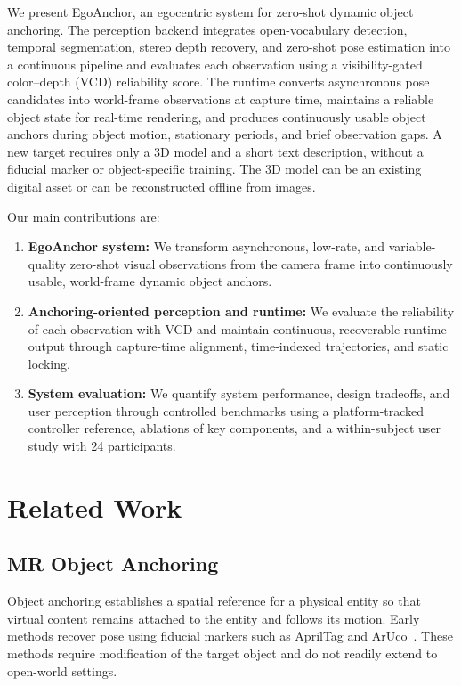 \documentclass[review]{vgtc}
\begin{document}
We present EgoAnchor, an egocentric system for zero-shot dynamic object anchoring. The perception backend integrates open-vocabulary detection, temporal segmentation, stereo depth recovery, and zero-shot pose estimation into a continuous pipeline and evaluates each observation using a visibility-gated color--depth (VCD) reliability score. The runtime converts asynchronous pose candidates into world-frame observations at capture time, maintains a reliable object state for real-time rendering, and produces continuously usable object anchors during object motion, stationary periods, and brief observation gaps. A new target requires only a 3D model and a short text description, without a fiducial marker or object-specific training. The 3D model can be an existing digital asset or can be reconstructed offline from images.

Our main contributions are:
\begin{enumerate}[leftmargin=1.8em,itemsep=1pt,topsep=2pt]
  \item \textbf{EgoAnchor system:} We transform asynchronous, low-rate, and variable-quality zero-shot visual observations from the camera frame into continuously usable, world-frame dynamic object anchors.
  \item \textbf{Anchoring-oriented perception and runtime:} We evaluate the reliability of each observation with VCD and maintain continuous, recoverable runtime output through capture-time alignment, time-indexed trajectories, and static locking.
  \item \textbf{System evaluation:} We quantify system performance, design tradeoffs, and user perception through controlled benchmarks using a platform-tracked controller reference, ablations of key components, and a within-subject user study with 24 participants.
\end{enumerate}

\section{Related Work}\label{sec:related-work}

\subsection{MR Object Anchoring}

Object anchoring establishes a spatial reference for a physical entity so that virtual content remains attached to the entity and follows its motion. Early methods recover pose using fiducial markers such as AprilTag and ArUco~\cite{apriltag2011,aruco2014}. These methods require modification of the target object and do not readily extend to open-world settings.
\end{document}
